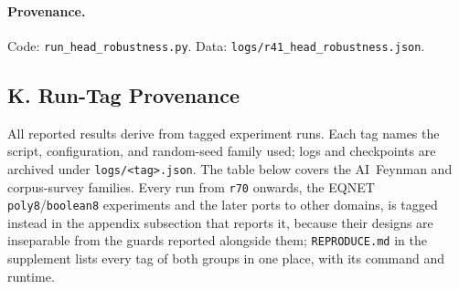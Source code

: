 \paragraph{Provenance.} Code: \texttt{run\_head\_robustness.py}. Data: \texttt{logs/r41\_head\_robustness.json}.

\subsection*{K. Run-Tag Provenance}

All reported results derive from tagged experiment runs. Each tag names the script, configuration, and random-seed family used; logs and checkpoints are archived under \texttt{logs/<tag>.json}. The table below covers the AI~Feynman and corpus-survey families. Every run from \texttt{r70} onwards, the EQNET \texttt{poly8}/\texttt{boolean8} experiments and the later ports to other domains, is tagged instead in the appendix subsection that reports it, because their designs are inseparable from the guards reported alongside them; \texttt{REPRODUCE.md} in the supplement lists every tag of both groups in one place, with its command and runtime.

